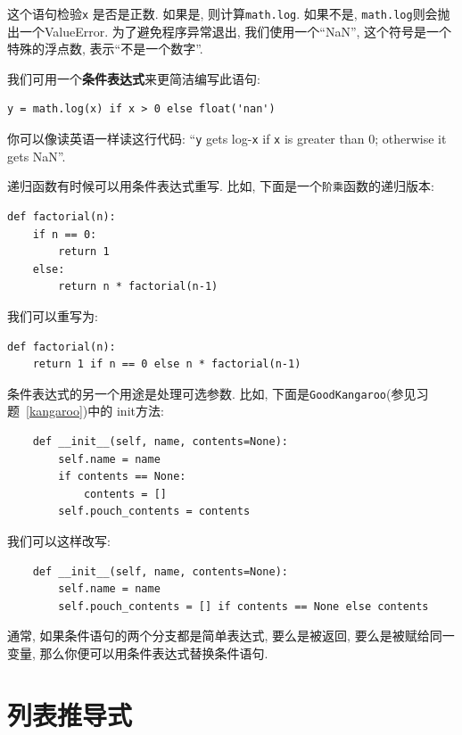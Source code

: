 \documentclass[10pt]{book}
\begin{document}
这个语句检验{\tt x} 是否是正数. 
如果是, 则计算{\tt math.log}. 
如果不是, {\tt math.log}则会抛出一个ValueError.
为了避免程序异常退出, 我们使用一个``NaN'', 这个符号是一个特殊的浮点数, 
表示``不是一个数字''. 

我们可用一个{\bf 条件表达式}来更简洁编写此语句:

\begin{verbatim}
y = math.log(x) if x > 0 else float('nan')
\end{verbatim}

你可以像读英语一样读这行代码: ``{\tt y} gets log-{\tt x}
if {\tt x} is greater than 0; otherwise it gets NaN''.

递归函数有时候可以用条件表达式重写. 
比如, 下面是一个{\tt 阶乘}函数的递归版本:

\begin{verbatim}
def factorial(n):
    if n == 0:
        return 1
    else:
        return n * factorial(n-1)
\end{verbatim}

我们可以重写为:

\begin{verbatim}
def factorial(n):
    return 1 if n == 0 else n * factorial(n-1)
\end{verbatim}

条件表达式的另一个用途是处理可选参数. 
比如, 下面是{\tt GoodKangaroo}(参见习题~\ref{kangaroo})中的
init方法:

\begin{verbatim}
    def __init__(self, name, contents=None):
        self.name = name
        if contents == None:
            contents = []
        self.pouch_contents = contents
\end{verbatim}

我们可以这样改写:

\begin{verbatim}
    def __init__(self, name, contents=None):
        self.name = name
        self.pouch_contents = [] if contents == None else contents 
\end{verbatim}

通常, 如果条件语句的两个分支都是简单表达式, 要么是被返回, 要么是被赋给同一变量, 
那么你便可以用条件表达式替换条件语句. 



\section{列表推导式}
\end{document}
